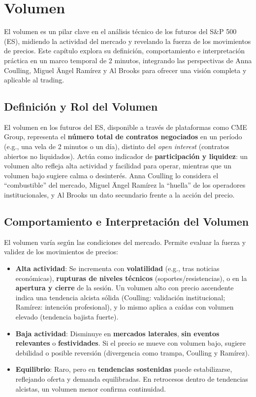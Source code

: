 \chapter{Volumen}  %

El volumen es un pilar clave en el an\'alisis t\'ecnico de los futuros del S\&P 500 (ES), midiendo la actividad del mercado y revelando la fuerza de los movimientos de precios. Este cap\'itulo explora su definici\'on, comportamiento e interpretaci\'on pr\'actica en un marco temporal de 2 minutos, integrando las perspectivas de Anna Coulling, Miguel \"Angel Ram\'irez y Al Brooks para ofrecer una visi\'on completa y aplicable al trading.

\section{Definici\'on y Rol del Volumen}

El volumen en los futuros del ES, disponible a trav\'es de plataformas como CME Group, representa el \textbf{n\'umero total de contratos negociados} en un per\'iodo (e.g., una vela de 2 minutos o un d\'ia), distinto del \textit{open interest} (contratos abiertos no liquidados). Act\'ua como indicador de \textbf{participaci\'on y liquidez}: un volumen alto refleja alta actividad y facilidad para operar, mientras que un volumen bajo sugiere calma o desinter\'es. Anna Coulling lo considera el ``combustible'' del mercado, Miguel \"Angel Ram\'irez la ``huella'' de los operadores institucionales, y Al Brooks un dato secundario frente a la acci\'on del precio.

\section{Comportamiento e Interpretaci\'on del Volumen}

El volumen var\'ia seg\'un las condiciones del mercado. Permite evaluar la fuerza y validez de los movimientos de precios:

\begin{itemize}
    \item \textbf{Alta actividad}: Se incrementa con \textbf{volatilidad} (e.g., tras noticias econ\'omicas), \textbf{rupturas de niveles t\'ecnicos} (soportes/resistencias), o en la \textbf{apertura y cierre} de la sesi\'on. Un volumen alto con precio ascendente indica una tendencia alcista s\'olida (Coulling: validaci\'on institucional; Ram\'irez: intenci\'on profesional), y lo mismo aplica a ca\'idas con volumen elevado (tendencia bajista fuerte).
    \item \textbf{Baja actividad}: Disminuye en \textbf{mercados laterales}, \textbf{sin eventos relevantes} o \textbf{festividades}. Si el precio se mueve con volumen bajo, sugiere debilidad o posible reversi\'on (divergencia como trampa, Coulling y Ram\'irez).
    \item \textbf{Equilibrio}: Raro, pero en \textbf{tendencias sostenidas} puede estabilizarse, reflejando oferta y demanda equilibradas. En retrocesos dentro de tendencias alcistas, un volumen menor confirma continuidad.
\end{itemize}

